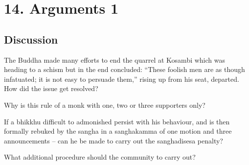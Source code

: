 \chapter{14. Arguments 1}
\renewcommand*{\theChapterTitle}{14. Arguments 1}

\section*{Discussion}


The Buddha made many efforts to end the quarrel at Kosambi which was heading to
a schism but in the end concluded: “These foolish men are as though infatuated;
it is not easy to persuade them,” rising up from his seat, departed. How did the
issue get resolved?

\bigskip



Why is this rule of a monk with one, two or three supporters only?

\bigskip



If a bhikkhu difficult to admonished persist with his behaviour, and is then
formally rebuked by the sangha in a sanghakamma of one motion and three
announcements – can he be made to carry out the sanghadisesa penalty?

\bigskip

What additional procedure should the community to carry out?

\bigskip

